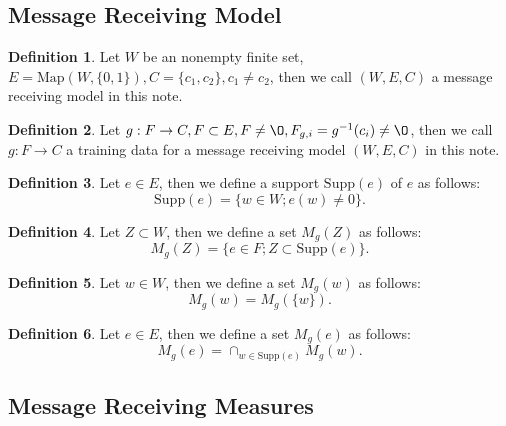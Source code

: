 \documentclass[11pt, a4note]{article}
\theoremstyle{definition}
\newtheorem{definition}{Definition}[section]
\begin{document}
\subsection{Message Receiving Model}

\begin{definition}
Let $ W $ be an nonempty finite set, $ E = \mathrm{Map}(W, \{0, 1\}), C = \{c_{1}, c_{2} \}, c_{1} \ne c_{2} $,
then we call $ (W, E, C) $ a message receiving model in this note.
\end{definition}

\begin{definition}
Let $ g : F \to C, F \subset E, F \ne \O, F_{g,i} = g^{-1}(c_{i}) \ne \O $, then we call $ g : F \to C $
a training data for a message receiving model $ (W, E, C) $ in this note.
\end{definition}

\begin{definition}
Let $ e \in E $, then we define a support $ \mathrm{Supp}(e) $ of $ e $ as follows:
\begin{equation}
\mathrm{Supp}(e) = \{ w \in W ; e(w) \ne 0\}.
\end{equation}
\end{definition}

\begin{definition}
Let $ Z \subset W $, then we define a set $ M_{g}(Z) $ as follows:
\begin{equation}
M_{g}(Z) = \{e \in F ; Z \subset \mathrm{Supp}(e)\}.
\end{equation}
\end{definition}

\begin{definition}
Let $ w \in W $, then we define a set $ M_{g}(w) $ as follows:
\begin{equation}
M_{g}(w) = M_{g}(\{w\}).
\end{equation}
\end{definition}

\begin{definition}
Let $ e \in E $, then we define a set $ M_{g}(e) $ as follows:
\begin{equation}
M_{g}(e) = \cap_{w \in \mathrm{Supp}(e)}M_{g}(w).
\end{equation}
\end{definition}

\subsection{Message Receiving Measures}
\end{document}
